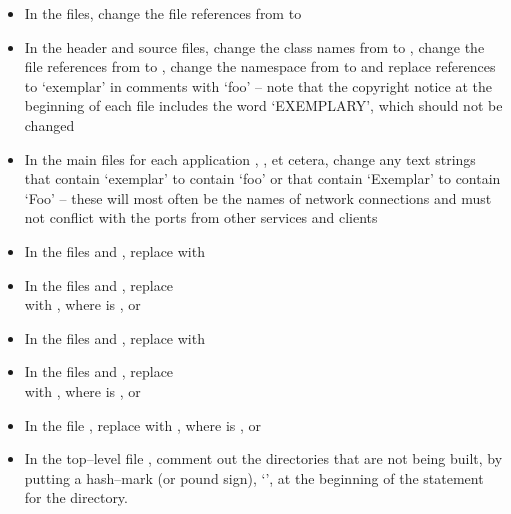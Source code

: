\begin{itemize}
\item In the  files, change the file references from
 to 
\item In the  header and source files, change the class names from
 to , change the file references from
 to , change the namespace from
 to  and replace references to `exemplar' in comments with
`foo' -- note that the copyright notice at the beginning of each file includes the word
`EXEMPLARY', which should not be changed
\item In the main files for each application \textbraceleft{},
, et cetera\textbraceright, change any text strings that
contain `exemplar' to contain `foo' or that contain `Exemplar' to contain `Foo' -- these
will most often be the names of \yarp{} network connections and must not conflict with the
ports from other services and clients
\item In the files  and , replace
 with
\item In the files  and
, replace\\
 with
,
where  is ,  or 
\item In the files  and , replace
with 
\item In the files  and ,
replace\\
with ,
where  is ,  or 
\item In the file , replace
 with ,
where  is ,  or 
\item In the top--level file , comment out the directories that are
not being built, by putting a hash--mark (or pound sign), `\asCode{\#}', at the beginning
of the  statement for the directory.
\end{itemize}
